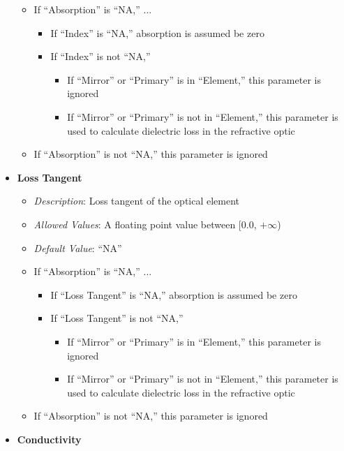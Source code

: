 \documentclass[11pt]{article} %
\begin{document}
\begin{itemize}[noitemsep,topsep=0pt]
\begin{itemize}[noitemsep,topsep=0pt]
		\item If ``Absorption'' is ``NA,'' ... 
			\begin{itemize}[noitemsep,topsep=0pt]
			\item If ``Index'' is ``NA,'' absorption is assumed be zero
			\item If ``Index'' is not ``NA,'' 
				\begin{itemize}[noitemsep,topsep=0pt]
				\item If ``Mirror'' or ``Primary'' is in ``Element,'' this parameter is ignored
				\item If ``Mirror'' or ``Primary'' is not in ``Element,'' this parameter is used to calculate dielectric loss in the refractive optic
				\end{itemize}
			\end{itemize}
		\item If ``Absorption'' is not ``NA,'' this parameter is ignored
		\end{itemize}
	\item \textbf{Loss Tangent}
		\begin{itemize}[noitemsep,topsep=0pt]
		\item \textit{Description}: Loss tangent of the optical element
		\item \textit{Allowed Values}: A floating point value between [0.0, $+\infty$)
		\item \textit{Default Value}: ``NA''
		\item If ``Absorption'' is ``NA,'' ... 
			\begin{itemize}[noitemsep,topsep=0pt]
			\item If ``Loss Tangent'' is ``NA,'' absorption is assumed be zero
			\item If ``Loss Tangent'' is not ``NA,'' 
				\begin{itemize}
				\item If ``Mirror'' or ``Primary'' is in ``Element,'' this parameter is ignored
				\item If ``Mirror'' or ``Primary'' is not in ``Element,'' this parameter is used to calculate dielectric loss in the refractive optic
				\end{itemize}
			\end{itemize}
		\item If ``Absorption'' is not ``NA,'' this parameter is ignored
		\end{itemize}
	\item \textbf{Conductivity}
		\begin{itemize}[noitemsep,topsep=0pt]

\end{itemize}
\end{itemize}
\end{document}
